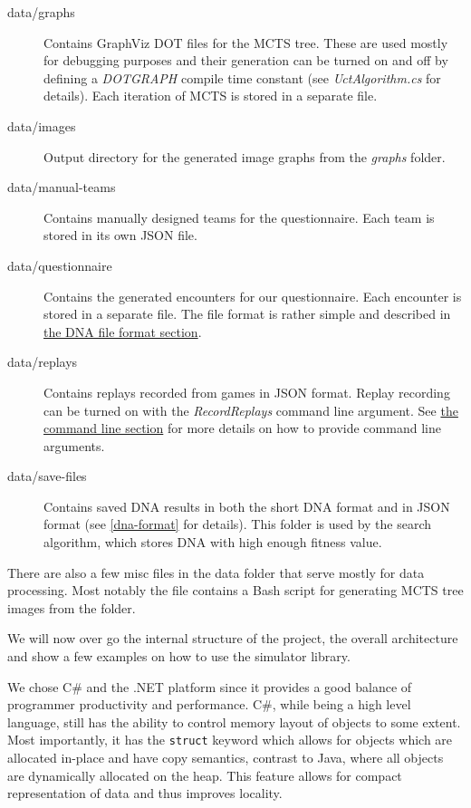 \begin{description}
	\item[data/graphs] Contains GraphViz DOT \citep{graphviz} files for the MCTS tree. These are used mostly for debugging purposes and their generation can be turned on and off by defining a \emph{DOTGRAPH} compile time constant (see \emph{UctAlgorithm.cs} for details). Each iteration of MCTS is stored in a separate file.
	\item[data/images] Output directory for the generated image graphs from the \emph{graphs} folder.
	\item[data/manual-teams] Contains manually designed teams for the questionnaire. Each team is stored in its own JSON \citep{json} file.
	\item[data/questionnaire] Contains the generated encounters for our questionnaire. Each encounter is stored
	in a separate file. The file format is rather simple and described in \hyperref[dna-format]{the DNA file format section}.
	\item[data/replays] Contains replays recorded from games in JSON format. Replay recording can be turned on with the \emph{RecordReplays} command line argument. See \hyperref[cmd-args]{the command line section} for more details on how to provide command line arguments.
	\item[data/save-files] Contains saved DNA results in both the short DNA format and in JSON format (see \autoref{dna-format} for details). This folder is used by the search algorithm, which stores DNA with high enough fitness value.
\end{description}

There are also a few misc files in the data folder that serve mostly for data processing. Most notably the  file contains a Bash \citep{bash} script for generating MCTS tree images from the  folder.

We will now over go the internal structure of the project, the overall architecture and show a few examples on how to use the simulator library.

We chose C\# and the .NET platform since it provides a good balance of programmer productivity and performance. C\#, while being a high level language, still has the ability to control memory layout of objects to some extent. Most importantly, it has the \verb|struct| keyword which allows for objects which are allocated in-place and have copy semantics, contrast to Java, where all objects are dynamically allocated on the heap. This feature allows for compact representation of data and thus improves locality.

